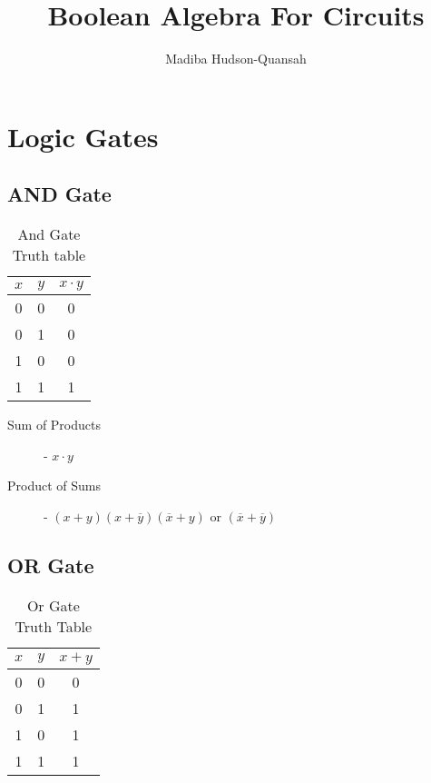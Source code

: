 \documentclass[12pt letter]{report}
\title{\Huge{Boolean Algebra For Circuits}}
\author{\huge{Madiba Hudson-Quansah}}
\date{}
\begin{document}
\maketitle
\newpage
{}
\tableofcontents
\pagebreak

\chapter{Logic Gates}

\section{AND Gate}

\begin{table}[h!]
  \caption{And Gate Truth table}\label{tab:and}
  \begin{center}
    \begin{tabular}{|c c|c|}
      \hline
      $x$ & $y$ & $x \cdot y$ \\ [0.5ex]
      \hline
      \hline
      0   & 0   & 0           \\
      0   & 1   & 0           \\
      1   & 0   & 0           \\
      1   & 1   & 1           \\
      \hline
    \end{tabular}
  \end{center}
\end{table}

\begin{description}
  \item[Sum of Products]  - $x \cdot y$
  \item[Product of Sums] - $ \left( x + y \right) \left( x + \overline{y} \right) \left( \overline{x} + y \right)   $
        or $ \left( \overline{x} + \overline{y} \right) $
\end{description}

\section{OR Gate}

\begin{table}[h!]
  \caption{Or Gate Truth Table}\label{tab:or}
  \begin{center}
    \begin{tabular}{|c c|c|}
      \hline
      $x$ & $y$ & $x + y$ \\ [0.5ex]
      \hline
      \hline
      0   & 0   & 0       \\
      0   & 1   & 1       \\
      1   & 0   & 1       \\
      1   & 1   & 1       \\
      \hline
    \end{tabular}
  \end{center}
\end{table}
\end{document}
